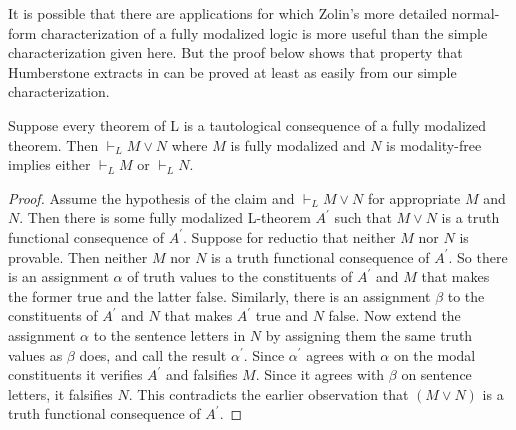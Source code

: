It is possible that there are applications for which Zolin's more detailed normal-form characterization of a fully modalized logic is more useful than the simple characterization given here. But the proof below shows that property that Humberstone extracts in \citet{Humberstone2016} can be proved at least as easily from our simple characterization.


\begin{theorem}
Suppose every theorem of L is a tautological consequence of a fully modalized theorem. Then $\vdash_LM\vee N$ where $M$ is fully modalized and $N$ is modality-free implies either $\vdash_LM$ or $\vdash_LN$. 
\end{theorem}
\begin{proof}
Assume the hypothesis of the claim and $\vdash_LM\vee N$ for appropriate $M$ and $N$. Then there is some fully modalized L-theorem $A^\prime$ such that $M\vee N$ is a truth functional consequence of $A^\prime$. Suppose for reductio that neither $M$ nor $N$ is provable. Then neither $M$ nor $N$ is a truth functional consequence of $A^\prime$. So there is an assignment $\alpha$ of truth values to the constituents of $A^\prime$ and $M$ that makes the former true and the latter false. Similarly, there is an assignment $\beta$ to the constituents of $A^\prime$ and $N$ that makes $A^\prime$ true and $N$ false. Now extend the assignment $\alpha$ to the sentence letters in $N$ by assigning them the same truth values as $\beta$ does, and call the result $\alpha^\prime$. Since $\alpha^\prime$ agrees with $\alpha$ on the modal constituents it verifies $A^\prime$ and falsifies $M$. Since it agrees with $\beta$ on sentence letters, it falsifies $N$. This contradicts the earlier observation that $(M\vee N)$ is a truth functional consequence of $A^\prime$.
\end{proof}

